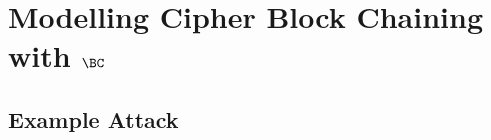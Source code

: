\chapter{Modelling Cipher Block Chaining with \texorpdfstring{$\BC$}{BC}}\label{chap:cbc-with-bc}

\section{Example Attack}\label{sec:example-attack}


